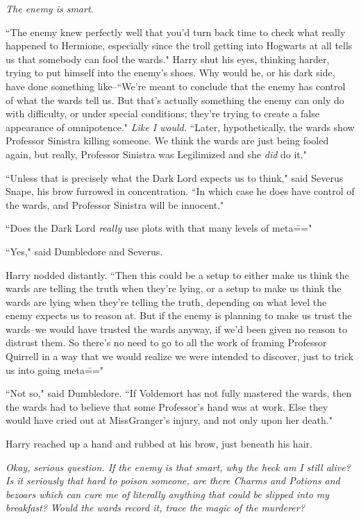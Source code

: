\emph{The enemy is smart.}

``The enemy knew perfectly well that you'd turn back time to check what really happened to Hermione, especially since the troll getting into Hogwarts at all tells us that somebody can fool the wards." Harry shut his eyes, thinking harder, trying to put himself into the enemy's shoes. Why would he, or his dark side, have done something like\---``We're meant to conclude that the enemy has control of what the wards tell us. But that's actually something the enemy can only do with difficulty, or under special conditions; they're trying to create a false appearance of omnipotence." \emph{Like I would.} ``Later, hypothetically, the wards show Professor Sinistra killing someone. We think the wards are just being fooled again, but really, Professor Sinistra was Legilimized and she \emph{did} do it."

``Unless that is precisely what the Dark Lord expects us to think," said Severus Snape, his brow furrowed in concentration. ``In which case he does have control of the wards, and Professor Sinistra will be innocent."

``Does the Dark Lord \emph{really} use plots with that many levels of meta\==="

``Yes," said Dumbledore and Severus.

Harry nodded distantly. ``Then this could be a setup to either make us think the wards are telling the truth when they're lying, or a setup to make us think the wards are lying when they're telling the truth, depending on what level the enemy expects us to reason at. But if the enemy is planning to make us trust the wards\---we would have trusted the wards anyway, if we'd been given no reason to distrust them. So there's no need to go to all the work of framing Professor Quirrell in a way that we would realize we were intended to discover, just to trick us into going meta\==="

``Not so," said Dumbledore. ``If Voldemort has not fully mastered the wards, then the wards had to believe that some Professor's hand was at work. Else they would have cried out at Miss\?Granger's injury, and not only upon her death."

Harry reached up a hand and rubbed at his brow, just beneath his hair.

\emph{Okay, serious question. If the enemy is that smart, why the heck am I still alive? Is it seriously that hard to poison someone, are there Charms and Potions and bezoars which can cure me of literally anything that could be slipped into my breakfast? Would the wards record it, trace the magic of the murderer?}

